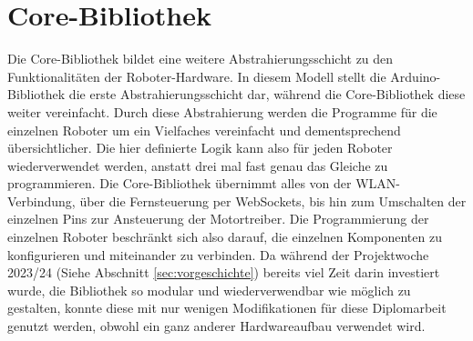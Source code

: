 \section{Core-Bibliothek}
\label{subec:robots_core}
Die Core-Bibliothek bildet eine weitere Abstrahierungsschicht zu den Funktionalitäten der Roboter-Hardware.
%
In diesem Modell stellt die Arduino-Bibliothek die erste Abstrahierungsschicht dar,
während die Core-Bibliothek diese weiter vereinfacht.
%
Durch diese Abstrahierung werden die Programme für die einzelnen Roboter um ein Vielfaches vereinfacht und dementsprechend übersichtlicher.
%
Die hier definierte Logik kann also für jeden Roboter wiederverwendet werden,
anstatt drei mal fast genau das Gleiche zu programmieren.
%
Die Core-Bibliothek übernimmt alles von der WLAN-Verbindung,
über die Fernsteuerung per WebSockets,
bis hin zum Umschalten der einzelnen Pins zur Ansteuerung der Motortreiber.
%
Die Programmierung der einzelnen Roboter beschränkt sich also darauf,
die einzelnen Komponenten zu konfigurieren und miteinander zu verbinden.
%
Da während der Projektwoche 2023/24 (Siehe Abschnitt \ref{sec:vorgeschichte}) bereits viel Zeit darin investiert wurde,
die Bibliothek so modular und wiederverwendbar wie möglich zu gestalten,
konnte diese mit nur wenigen Modifikationen für diese Diplomarbeit genutzt werden,
obwohl ein ganz anderer Hardwareaufbau verwendet wird.

